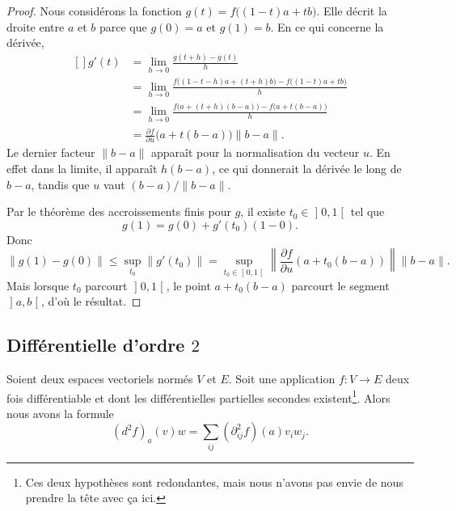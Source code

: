 \begin{proof}
	Nous considérons la fonction \( g(t)=f\big( (1-t)a+tb \big)\). Elle décrit la droite entre \( a\) et \( b\) parce que \( g(0)=a\) et \( g(1)=b\). En ce qui concerne la dérivée,
	\begin{equation}
		\begin{aligned}[]
			g'(t) & =\lim_{h\to 0} \frac{ g(t+h)-g(t) }{ h }                                          \\
			      & =\lim_{h\to 0} \frac{ f\big( (1-t-h)a+(t+h)b \big)- f\big( (1-t)a+tb \big) }{ h } \\
			      & =\lim_{h\to 0} \frac{ f\big( a+(t+h)(b-a) \big)-f\big( a+t(b-a) \big) }{ h }      \\
			      & =\frac{ \partial f }{ \partial u }\big( a+t(b-a) \big)\| b-a \|.
		\end{aligned}
	\end{equation}
	Le dernier facteur \( \| b-a \|\) apparaît pour la normalisation du vecteur \( u\). En effet dans la limite, il apparaît \( h(b-a)\), ce qui donnerait la dérivée le long de \( b-a\), tandis que \( u\) vaut \( (b-a)/\| b-a \|\).

	Par le théorème des accroissements finis pour \( g\), il existe \( t_0\in\mathopen] 0 , 1 \mathclose[\) tel que
		\begin{equation}
			g(1)=g(0)+g'(t_0)(1-0).
		\end{equation}
		Donc
		\begin{equation}
			\| g(1)-g(0) \|\leq\sup_{t_0}\| g'(t_0) \|=\sup_{t_0\in\mathopen] 0 , 1 \mathclose[}\left\| \frac{ \partial f }{ \partial u }(a+t_0(b-a)) \right\|\| b-a \|.
		\end{equation}
		Mais lorsque \( t_0\) parcourt \( \mathopen] 0 , 1 \mathclose[\), le point \( a+t_0(b-a)\) parcourt le segment \( \mathopen] a , b \mathclose[\), d'où le résultat.
\end{proof}


\subsection{Différentielle d'ordre \( 2\)}

\begin{proposition}		\label{PROPooBODMooJHyzup}
	Soient deux espaces vectoriels normés \( V\) et \( E\). Soit une application \(f \colon V\to E  \) deux fois différentiable et dont les différentielles partielles secondes existent\footnote{Ces deux hypothèses sont redondantes, mais nous n'avons pas envie de nous prendre la tête avec ça ici.}. Alors nous avons la formule
	\begin{equation}
		(d^2f)_a(v)w=\sum_{ij}(\partial^2_{ij}f)(a)v_iw_j.
	\end{equation}
\end{proposition}

